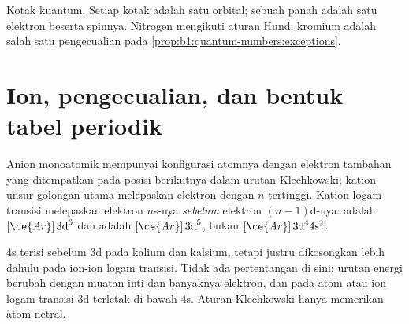 \begin{omfigure}

{\small Kotak kuantum. Setiap kotak adalah satu orbital; sebuah panah
adalah satu elektron beserta spinnya. Nitrogen mengikuti aturan Hund;
kromium adalah salah satu pengecualian pada
\cref{prop:b1:quantum-numbers:exceptions}.}
\end{omfigure}

\section{Ion, pengecualian, dan bentuk tabel periodik}

\begin{proposition}\label{prop:b1:quantum-numbers:ions}
Anion monoatomik mempunyai konfigurasi atomnya dengan elektron tambahan
yang ditempatkan pada posisi berikutnya dalam urutan Klechkowski; kation
unsur golongan utama melepaskan elektron dengan $n$ tertinggi. Kation
logam transisi melepaskan elektron $n$s-nya \emph{sebelum} elektron
$(n-1)$d-nya:  adalah $[\ce{Ar}]\,3\text{d}^6$ dan
 adalah $[\ce{Ar}]\,3\text{d}^5$, bukan $[\ce{Ar}]\,3\text{d}^4
4\text{s}^2$.
\end{proposition}
\admitted

\begin{remark}\label{rem:b1:quantum-numbers:order}
4s terisi sebelum 3d pada kalium dan kalsium, tetapi justru dikosongkan
lebih dahulu pada ion-ion logam transisi. Tidak ada pertentangan di sini:
urutan energi  berubah dengan muatan inti dan banyaknya elektron,
dan pada atom atau ion logam transisi  3d terletak di bawah 4s.
Aturan Klechkowski hanya memerikan atom netral.
\end{remark}

